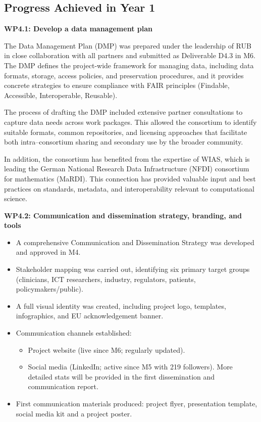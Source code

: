 \documentclass[a4paper,12pt, numbers]{article}
\begin{document}
\subsection{Progress Achieved in Year 1} %

\noindent\textbf{WP4.1: Develop a data management plan}

The Data Management Plan (DMP) was prepared under the leadership of RUB in close collaboration with all partners and submitted as Deliverable D4.3 in M6. The DMP defines the project-wide framework for managing data, including data formats, storage, access policies, and preservation procedures, and it provides concrete strategies to ensure compliance with FAIR principles (Findable, Accessible, Interoperable, Reusable).  

The process of drafting the DMP included extensive partner consultations to capture data needs across work packages. This allowed the consortium to identify suitable formats, common repositories, and licensing approaches that facilitate both intra--consortium sharing and secondary use by the broader community.  

In addition, the consortium has benefited from the expertise of WIAS, which is leading the German National Research Data Infrastructure (NFDI) consortium for mathematics (MaRDI). This connection has provided valuable input and best practices on standards, metadata, and interoperability relevant to computational science.  



\noindent\textbf{WP4.2: Communication and dissemination strategy, branding, and tools}

\begin{itemize}[left=1em, itemsep=0pt, topsep=0pt]
\item A comprehensive Communication and Dissemination Strategy was developed and approved in M4.
\item Stakeholder mapping was carried out, identifying six primary target groups (clinicians, ICT researchers, industry, regulators, patients, policymakers/public).
\item A full visual identity was created, including project logo, templates, infographics, and EU acknowledgement banner.
\item Communication channels established:
\begin{itemize}[left=1em, itemsep=0pt, topsep=0pt]
\item Project website (live since M6; regularly updated).
\item Social media (LinkedIn; active since M5 with 219 followers). More detailed stats will be provided in the first dissemination and communication report.
\end{itemize}
\item First communication materials produced: project flyer, presentation template, social media kit and a project poster.
\end{itemize}
\end{document}
